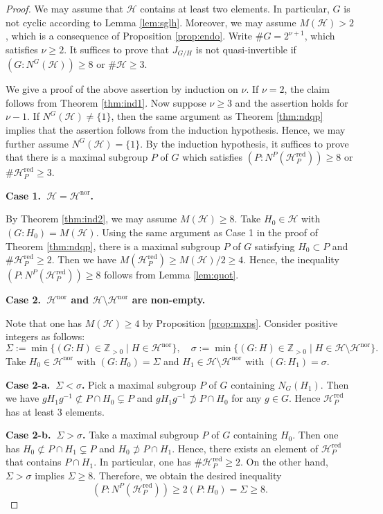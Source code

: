 \documentclass[12pt]{amsart}
\theoremstyle{plain}
\theoremstyle{definition}
\numberwithin{thm}{section}
\numberwithin{equation}{section}
\newcommand{\Zpn}{\mathbb{Z}_{>0}}
\newcommand{\cH}{\mathcal{H}}
\DeclareMathOperator{\red}{red}
\DeclareMathOperator{\nor}{nor}
\begin{document}
\begin{proof}
We may assume that $\cH$ contains at least two elements. In particular, $G$ is not cyclic according to Lemma \ref{lem:sglh}. Moreover, we may assume $M(\cH)>2$, which is a consequence of Proposition \ref{prop:endo}. Write $\#G=2^{\nu+1}$, which satisfies $\nu \geq 2$. It suffices to prove that $J_{G/H}$ is not quasi-invertible if $(G:N^{G}(\cH))\geq 8$ or $\#\cH \geq 3$. 

We give a proof of the above assertion by induction on $\nu$. If $\nu=2$, the claim follows from Theorem \ref{thm:ind1}. Now suppose $\nu \geq 3$ and the assertion holds for $\nu-1$. If $N^{G}(\cH)\neq \{1\}$, then the same argument as Theorem \ref{thm:ndqp} implies that the assertion follows from the induction hypothesis. Hence, we may further assume $N^{G}(\cH)=\{1\}$. By the induction hypothesis, it suffices to prove that there is a maximal subgroup $P$ of $G$ which satisfies $(P:N^{P}(\cH_{P}^{\red}))\geq 8$ or $\#\cH_{P}^{\red}\geq 3$. 

\textbf{Case 1.~$\cH=\cH^{\nor}$. }

By Theorem \ref{thm:ind2}, we may assume $M(\cH)\geq 8$. Take $H_{0}\in \cH$ with $(G:H_{0})=M(\cH)$. Using the same argument as Case 1 in the proof of Theorem \ref{thm:ndqp}, there is a maximal subgroup $P$ of $G$ satisfying $H_{0}\subset P$ and $\#\cH_{P}^{\red}\geq 2$. Then we have $M(\cH_{P}^{\red})\geq M(\cH)/2\geq 4$. Hence, the inequality $(P:N^{P}(\cH_{P}^{\red}))\geq 8$ follows from Lemma \ref{lem:quot}. 

\textbf{Case 2.~$\cH^{\nor}$ and $\cH\setminus \cH^{\nor}$ are non-empty. }

Note that one has $M(\cH)\geq 4$ by Proposition \ref{prop:mxps}. Consider positive integers as follows: 
\begin{equation}\label{eq:sgd2}
\Sigma:=\min\{(G:H)\in \Zpn \mid H\in \cH^{\nor}\},\quad 
\sigma:=\min\{(G:H)\in \Zpn \mid H\in \cH\setminus \cH^{\nor}\}. 
\end{equation}
Take $H_{0}\in \cH^{\nor}$ with $(G:H_{0})=\Sigma$ and $H_{1}\in \cH \setminus \cH^{\nor}$ with $(G:H_{1})=\sigma$. 

\textbf{Case 2-a.~$\Sigma<\sigma$. }
Pick a maximal subgroup $P$ of $G$ containing $N_{G}(H_{1})$. Then we have $gH_{1}g^{-1}\not\subset P\cap H_{0}\subsetneq P$ and $gH_{1}g^{-1}\not\supset P\cap H_{0}$ for any $g\in G$. Hence $\cH_{P}^{\red}$ has at least $3$ elements. 

\textbf{Case 2-b.~$\Sigma>\sigma$. }
Take a maximal subgroup $P$ of $G$ containing $H_{0}$. Then one has $H_{0}\not\subset P\cap H_{1}\subsetneq P$ and $H_{0}\not\supset P\cap H_{1}$. Hence, there exists an element of $\cH_{P}^{\red}$ that contains $P\cap H_{1}$. In particular, one has $\#\cH_{P}^{\red}\geq 2$. On the other hand, $\Sigma>\sigma$ implies $\Sigma \geq 8$. Therefore, we obtain the desired inequality
\begin{equation*}
(P:N^{P}(\cH_{P}^{\red}))\geq 2(P:H_{0})=\Sigma \geq 8. 
\end{equation*}


\end{proof}
\end{document}
